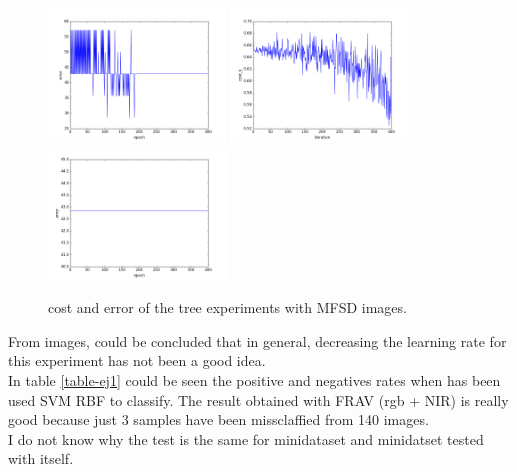 \begin{figure}[htb]
\includegraphics[width=0.42\textwidth]{images/redes/ejecucion1/general_svm_mfsd/minidataset_tested_itself/error.png}
\includegraphics[width=0.42\textwidth]{images/redes/ejecucion1/general_svm_mfsd/minidataset_tested_iteself_lr_0_001/cost.png}
\includegraphics[width=0.42\textwidth]{images/redes/ejecucion1/general_svm_mfsd/minidataset_tested_iteself_lr_0_001/error.png}
\caption{cost and error of the tree experiments with MFSD images.} \label{fig:mfsd-ejec1}
\end{figure}

From images, could be concluded that in general, decreasing the learning rate for this experiment has not been a good idea.\\

In table \ref{table-ej1} could be seen the positive and negatives rates when has been used SVM RBF to classify. The result obtained with FRAV (rgb + NIR) is really good because just 3 samples have been missclaffied from 140 images.\\

I do not know why the test is the same for minidataset and minidatset tested with itself.\\

